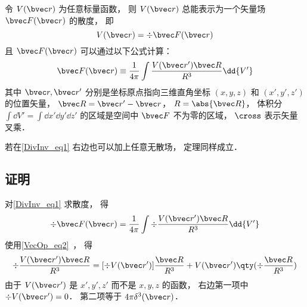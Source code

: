 
\begin{theorem}{}
令 $V(\bvec r)$ 为任意标量函数， 则 $V(\bvec r)$ 总能表示为一个矢量场 $\bvec F(\bvec r)$ 的散度， 即
\begin{equation}
V(\bvec r) = \div \bvec F(\bvec r)
\end{equation}
且 $\bvec F(\bvec r)$ 可以通过以下公式计算：
\begin{equation}\label{DivInv_eq1}
\bvec F(\bvec r) \equiv \frac{1}{4\pi}\int \frac{V(\bvec r') \bvec R}{R^3} \dd{V'}
\end{equation}
其中 $\bvec r, \bvec r'$ 分别是坐标原点指向三维直角坐标 $(x, y, z)$ 和 $(x', y', z')$ 的位置矢量， $\bvec R = \bvec r' - \bvec r$， $R = \abs{\bvec R}$， 体积分 $\int\dd{V'} = \int\dd{x'}\dd{y'}\dd{z'}$ 的区域是空间中 $\bvec F$ 不为零的区域， $\cross$ 表示矢量叉乘．

若在\autoref{DivInv_eq1} 右边也可以加上任意无散场， 定理同样成立．
\end{theorem}

\subsection{证明}
对\autoref{DivInv_eq1} 求散度， 得
\begin{equation}
\div \bvec F(\bvec r) = \frac{1}{4\pi}\int \div \frac{V(\bvec r') \bvec R}{R^3} \dd{V'}
\end{equation}
使用\autoref{VecOp_eq2}~， 得
\begin{equation}
\div \frac{V(\bvec r') \bvec R}{R^3} = [\div V(\bvec r')] \frac{ \bvec R}{R^3} + V(\bvec r') \qty(\div \frac{\bvec R}{R^3})
\end{equation}
由于 $V(\bvec r')$ 是 $x', y', z'$ 而不是 $x, y, z$ 的函数， 右边第一项中 $\div V(\bvec r') = 0$． 第二项等于 $4\pi \delta^3(\bvec r)$．
